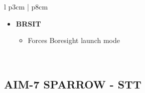 \documentclass[8pt,usenames,dvipsnames,twoside]{article}
\begin{document}
\begin{center}
\begin{longtable}{l p{3cm} | p{8cm}}
\begin{minipage}[t]{\linewidth}
\begin{itemize}
\begin{itemize}
						\end{itemize}
						\item \textbf{BRSIT}
						\begin{itemize}
							\item Forces Boresight launch mode
						\end{itemize}
					\end{itemize}
				\end{minipage} \\
				\bottomrule
			\end{longtable}
		\end{center}
		\begin{center}
		\end{center}
		
		\subsection{AIM-7 SPARROW - STT}
\end{document}
